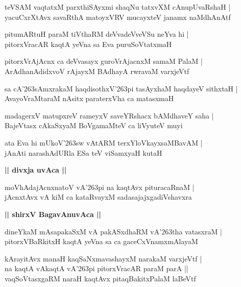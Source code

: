 \documentclass[twoside,12pt,openright]{book}
\def\S{\char'263}
\newcounter{shloka}[chapter]
\def\uvaca#1{\centerline{{\large\textbf{#1}}}}
\begin{document}
\begin{shloka}%
teVSAM vaqtatxM parxthiSAyxmi shaqNu tatxvXM cAnupUvaRshaH |\\
yacuCxrXtAvx savaRthA matoyxVRV mucayxteV janamx naMdhAnAtf 
\end{shloka}

\begin{shloka}%
pitumARtuH paraM tiVthaRM deVvadeVveVSu neYva hi |\\
pitorxVracAR kaqtA yeVna sa Eva puruSoVtatxmaH 
\end{shloka}

\begin{shloka}%
pitorxVrAjAcnx ca deVvasayx guroVrAjacnxM samaM PalaM |\\
ArAdhanAdidxvoV rAjayxM BAdhayA rwravaM varxjeVtf 
\end{shloka}

\begin{shloka}%
sa cA\S sAmxrakaM haqdisothxV\S pi tasAyxhaM haqdayeV sithxtaH |\\
AvayoVraMtaraM nAsitx paraterxVha ca matasxmaH 
\end{shloka}

\begin{shloka}%
madagerxV matupxreV rameyxV saveYRshacx bAMdhaveY saha |\\
BajeVtasx cAkaSxyaM BoVgamaMteV ca liVyuteV muyi
\end{shloka}

\begin{shloka}%
ata Eva hi mUkoV\S sw vAtARM terxYloVkayxsaMBavAM |\\
jAnAti narashAdURla ESa teV viSamxyaH kutaH 
\end{shloka}

\uvaca{|| divxja uvAca ||}

\begin{shloka}%
moVhAdajAcnxnatoV vA\S pi na kaqtAvx pituracaRnaM |\\
jAcnxtAvx vA kiM ca kataRvayxM sadasajajxgadiVshavxra
\end{shloka}

\uvaca{|| shirxV BagavAnuvAca ||}

\begin{shloka}%
dineYkaM mAsapakaSxM vA pakASxdhaRM vA\S tha vatasxraM |\\
pitorxVBaRkitxH kaqtA yeVna sa ca gaceCxVnamxmAlayaM 
\end{shloka}

\begin{shloka}%
kArayitAvx manaH kaqSaNxmavashayxM narakaM varxjeVtf |\\
na kaqtA vAkaqtA vA\S pi pitorxVracAR paraM parA ||\\
vaqSoVtasxgaRM naraH kaqtAvx pitaqBakitxPalaM laBeVtf
\end{shloka}
\end{document}
